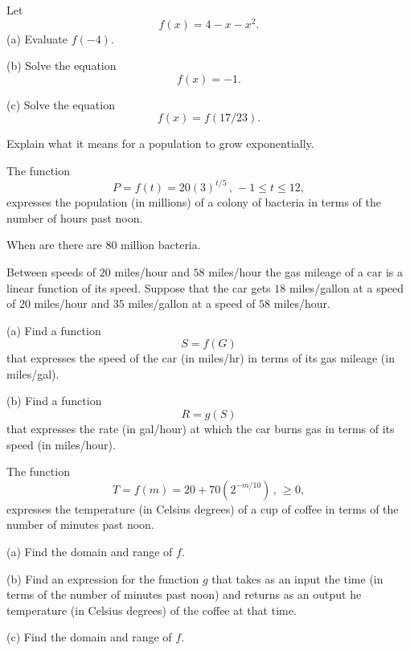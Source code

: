 \documentclass{ximera}
\begin{document}
\begin{question} \label{Qpdf0gbvgbrtg}
Let
\[
      f(x) = 4 - x - x^2 .
\]
(a) Evaluate $f(-4)$.

(b) Solve the equation 
\[
      f(x) = -1 .
\]

(c) Solve the equation
\[
       f(x) = f(17/23) .
\]
\end{question}


\begin{question}  \label{Eer5htrree}
Explain what it means for a population to grow exponentially.
\end{question}

\begin{question}
The function
\[
  P = f(t) = 20 (3)^{t/5} \, , \, -1 \leq t \leq 12 ,
\]
expresses the population (in millions) of a colony of bacteria in terms of the number of hours past noon. 

When are there are 80 million bacteria.
\end{question}


\begin{question}  \label{Q99834322}
Between speeds of $20$ miles/hour and $58$ miles/hour the gas mileage of a car is a linear function of its speed. Suppose that the car gets $18$ miles/gallon at a speed of $20$ miles/hour and $35$ miles/gallon at a speed of $58$ miles/hour.

(a) Find a function 
\[
       S = f(G)
\]
that expresses the speed of the car (in miles/hr) in terms of its gas mileage (in miles/gal).

(b) Find a function 
\[
   R = g(S)
\]
that expresses the rate (in gal/hour) at which the car burns gas in terms of its speed (in miles/hour).

\end{question}


\begin{question}  \label{QDFdf4444}
The function
\[
      T = f(m) = 20 + 70 (2^{-m/10}) \, , \, \geq 0 ,
\]
expresses the temperature (in Celsius degrees) of a cup of coffee in terms of the number of minutes past noon.

(a) Find the domain and range of $f$.

(b) Find an expression for the function $g$ that takes as an input the time (in terms of the number of minutes past noon) and returns as an output he temperature (in Celsius degrees) of the coffee at that time.

(c) Find the domain and range of $f$.

\end{question}
\end{document}
